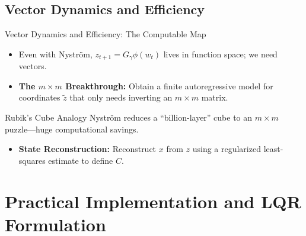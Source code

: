 \documentclass{beamer}
\begin{document}
\subsection{Vector Dynamics and Efficiency}
\begin{frame}[allowframebreaks]{Vector Dynamics and Efficiency: The Computable Map}
\begin{itemize}
  \item Even with Nyström, $z_{t+1}=G_\gamma \phi(w_t)$ lives in function space; we need vectors.
  \item \textbf{The $m\times m$ Breakthrough:} Obtain a finite autoregressive model for coordinates $\tilde{z}$ that only needs inverting an $m\times m$ matrix.
\end{itemize}

\framebreak

\begin{block}{Rubik's Cube Analogy}
Nyström reduces a ``billion-layer'' cube to an $m\times m$ puzzle—huge computational savings.
\end{block}

\begin{itemize}
  \item \textbf{State Reconstruction:} Reconstruct $x$ from $z$ using a regularized least-squares estimate to define $C$.
\end{itemize}
\end{frame}

\section{Practical Implementation and LQR Formulation}
\end{document}

